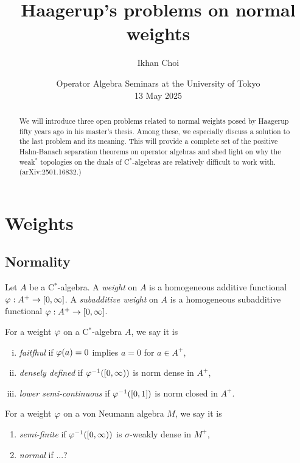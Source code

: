\documentclass{../../../../small}
\begin{document}
\title{Haagerup's problems on normal weights}
\author{Ikhan Choi}
\date{Operator Algebra Seminars at the University of Tokyo\\13 May 2025}
\maketitle

\begin{abstract}
We will introduce three open problems related to normal weights posed by Haagerup fifty years ago in his master's thesis. Among these, we especially discuss a solution to the last problem and its meaning. This will provide a complete set of the positive Hahn-Banach separation theorems on operator algebras and shed light on why the weak$^*$ topologies on the duals of C$^*$-algebras are relatively difficult to work with. (arXiv:2501.16832.)
\end{abstract}

\tableofcontents

\section{Weights}

\subsection{Normality}

\begin{defn*}
Let $A$ be a C$^*$-algebra.
A \emph{weight} on $A$ is a homogeneous additive functional $\varphi:A^+\to[0,\infty]$.
A \emph{subadditive weight} on $A$ is a homogeneous subadditive functional $\varphi:A^+\to[0,\infty]$.
\end{defn*}

\begin{defn*}
For a weight $\varphi$ on a C$^*$-algebra $A$, we say it is
\begin{enumerate}[(i)]
\item \emph{faitfhul} if $\varphi(a)=0$ implies $a=0$ for $a\in A^+$,
\item \emph{densely defined} if $\varphi^{-1}([0,\infty))$ is norm dense in $A^+$,
\item \emph{lower semi-continuous} if $\varphi^{-1}([0,1])$ is norm closed in $A^+$.
\end{enumerate}
For a weight $\varphi$ on a von Neumann algebra $M$, we say it is
\begin{enumerate}
\item[(ii')] \emph{semi-finite} if $\varphi^{-1}([0,\infty))$ is $\sigma$-weakly dense in $M^+$,
\item[(iii')] \emph{normal} if ...?
\end{enumerate}
\end{defn*}
\end{document}
